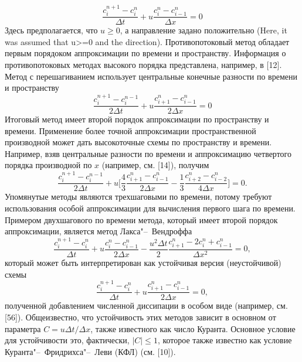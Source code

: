 %
\begin{equation}
\label{eq:equation2_3}
\frac{c_i^{n+1}-c_i^n}{\Delta t} + u\frac{c_i^n-c_{i-1}^{n}}{\Delta x} = 0
\end{equation}
%
Здесь предполагается, что $u\ge0$, а направление задано положительно (Here, it was assumed that u>=0 and the direction). Противопотоковый метод обладает первым порядоком аппроксимации по времени и пространству. Информация о противопотоковых методах высокого порядка представлена, например, в [12]. Метод с перешагиванием использует центральные конечные разности по времени и пространству
%
\begin{equation}
\label{eq:equation2_4}
\frac{c_i^{n+1}-c_i^{n-1}}{2\Delta t} + u\frac{c_{i+1}^n-c_{i-1}^{n}}{2\Delta x} = 0
\end{equation}
%
Итоговый метод имеет второй порядок аппроксимации по пространству и времени. Применение более точной аппроксимации пространственной производной может дать высокоточные схемы по пространству и времени. Например, взяв центральные разности по времени и аппроксимацию четвертого порядка производной по $x$ (например, см. [14]), получим
%
\begin{equation}
\label{eq:equation2_5}
\frac{c_i^{n+1}-c_i^{n-1}}{2\Delta t} + u\Big[\frac{4}{3}\frac{c_{i+1}^n-c_{i-1}^n}{2\Delta x}-\frac{1}{3}\frac{c_{i+2}^n-c_{i-2}^n}{4\Delta x}\Big] = 0.
\end{equation}
%
Упомянутые методы являются трехшаговыми по времени, потому требуют использования особой аппроксимации для вычисления первого шага по времени. Примером двухшагового по времени метода, который имеет второй порядок аппроксимации, является метод Лакса"--~Вендроффа
%
\begin{equation}
\label{eq:equation2_6}
\frac{c_i^{n+1}-c_i^n}{\Delta t} + u\frac{c_i^n-c_{i-1}^n}{2\Delta x} - \frac{u^2\Delta t}{2}\frac{c_{i+1}^n-2c_i^n+c_{i-1}^n}{\Delta x^2} = 0,
\end{equation}
%
который может быть  интерпретирован как устойчивая версия (неустойчивой) схемы
%
\begin{equation}
\label{eq:equation2_7}
\frac{c_i^{n+1}-c_i^n}{\Delta t} + u\frac{c_{i+1}^n-c_{i-1}^n}{2\Delta x} = 0,
\end{equation}
%
полученной добавлением численной диссипации в особом виде (например, см. [56]). Общеизвестно, что устойчивость этих методов зависит в основном от параметра $C=u\Delta t/\Delta x$, также известного как число Куранта. Основное условие для устойчивости это, фактически, $\left|C\right|\le1$, которое также известно как условие Куранта"--~Фридрихса"--~Леви (КФЛ) (см. [10]).

